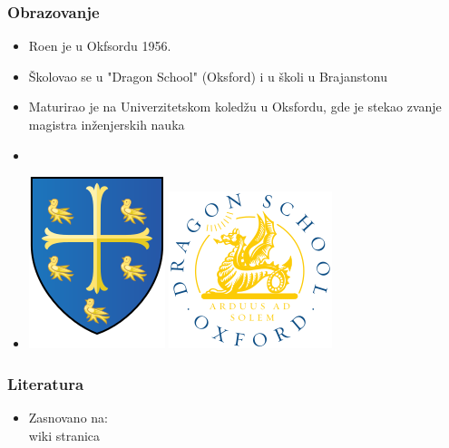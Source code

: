 \documentclass{beamer}
\def\d{{\fontencoding{T1}\selectfont\dj}}
\begin{document}
\begin{frame}
	\frametitle{Obrazovanje}
	\begin{itemize}
		\item Ro{\d}en je u Okfsordu 1956.
		\item Školovao se u "Dragon School" (Oksford) i u školi u Brajanstonu 
		\item Maturirao je na Univerzitetskom koledžu u Oksfordu, gde je stekao zvanje magistra inženjerskih nauka
		\item[]
		\item[] \begin{center} \includegraphics[scale=0.25]{University_College_Oxford_Coat_Of_Arms.png} \hspace{25} \includegraphics[scale=0.3]{Dragon_Coat_Of_Arms.png} \end{center}
	\end{itemize}
\end{frame}

\begin{frame}[fragile]\frametitle{Literatura}
	\begin{itemize}
		\item Zasnovano na:\\
		wiki stranica
	\end{itemize}
\end{frame}
\end{document}
